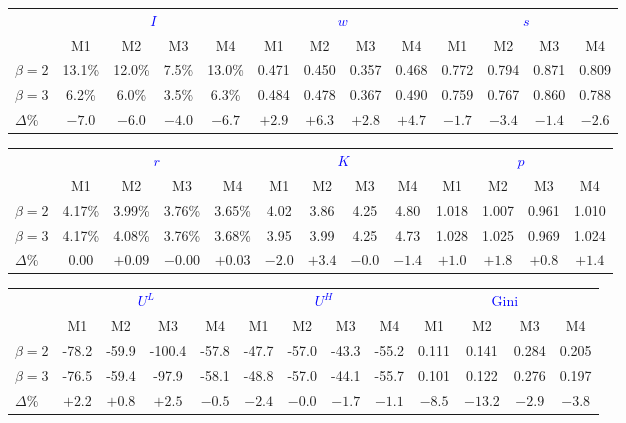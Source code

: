 \documentclass{article}
\begin{document}
\begin{tabular}{l|cccc|cccc|cccc}
\toprule
& \multicolumn{4}{c|}{\textcolor{blue}{$I$}} 
& \multicolumn{4}{c|}{\textcolor{blue}{$w$}} 
& \multicolumn{4}{c}{\textcolor{blue}{$s$}} \\
& M1 & M2 & M3 & M4 & M1 & M2 & M3 & M4 & M1 & M2 & M3 & M4 \\
\midrule
$\beta=2$ & 13.1\% & 12.0\% & 7.5\% & 13.0\% & 0.471 & 0.450 & 0.357 & 0.468 & 0.772 & 0.794 & 0.871 & 0.809 \\
$\beta=3$ & 6.2\% & 6.0\% & 3.5\% & 6.3\% & 0.484 & 0.478 & 0.367 & 0.490 & 0.759 & 0.767 & 0.860 & 0.788 \\
$\Delta\%$ & $-7.0$ & $-6.0$ & $-4.0$ & $-6.7$ & $+2.9$ & $+6.3$ & $+2.8$ & $+4.7$ & $-1.7$ & $-3.4$ & $-1.4$ & $-2.6$ \\
\bottomrule
\end{tabular}

\vspace{0.3cm}

\begin{tabular}{l|cccc|cccc|cccc}
\toprule
& \multicolumn{4}{c|}{\textcolor{blue}{$r$}} 
& \multicolumn{4}{c|}{\textcolor{blue}{$K$}} 
& \multicolumn{4}{c}{\textcolor{blue}{$p$}} \\
& M1 & M2 & M3 & M4 & M1 & M2 & M3 & M4 & M1 & M2 & M3 & M4 \\
\midrule
$\beta=2$ & 4.17\% & 3.99\% & 3.76\% & 3.65\% & 4.02 & 3.86 & 4.25 & 4.80 & 1.018 & 1.007 & 0.961 & 1.010 \\
$\beta=3$ & 4.17\% & 4.08\% & 3.76\% & 3.68\% & 3.95 & 3.99 & 4.25 & 4.73 & 1.028 & 1.025 & 0.969 & 1.024 \\
$\Delta\%$ & $0.00$ & $+0.09$ & $-0.00$ & $+0.03$ & $-2.0$ & $+3.4$ & $-0.0$ & $-1.4$ & $+1.0$ & $+1.8$ & $+0.8$ & $+1.4$ \\
\bottomrule
\end{tabular}

\vspace{0.3cm}

\begin{tabular}{l|cccc|cccc|cccc}
\toprule
& \multicolumn{4}{c|}{\textcolor{blue}{$U^L$}} 
& \multicolumn{4}{c|}{\textcolor{blue}{$U^H$}} 
& \multicolumn{4}{c}{\textcolor{blue}{$\text{Gini}$}} \\
& M1 & M2 & M3 & M4 & M1 & M2 & M3 & M4 & M1 & M2 & M3 & M4 \\
\midrule
$\beta=2$ & -78.2 & -59.9 & -100.4 & -57.8 & -47.7 & -57.0 & -43.3 & -55.2 & 0.111 & 0.141 & 0.284 & 0.205 \\
$\beta=3$ & -76.5 & -59.4 & -97.9 & -58.1 & -48.8 & -57.0 & -44.1 & -55.7 & 0.101 & 0.122 & 0.276 & 0.197 \\
$\Delta\%$ & $+2.2$ & $+0.8$ & $+2.5$ & $-0.5$ & $-2.4$ & $-0.0$ & $-1.7$ & $-1.1$ & $-8.5$ & $-13.2$ & $-2.9$ & $-3.8$ \\
\bottomrule
\end{tabular}
\end{document}
